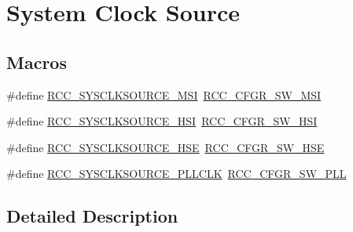 \hypertarget{group___r_c_c___system___clock___source}{\section{System Clock Source}
\label{group___r_c_c___system___clock___source}
}
\subsection*{Macros}
\begin{DoxyCompactItemize}
\item 
\#define \hyperlink{group___r_c_c___system___clock___source_ga1e02722521eb426d481d52ba9f79afef}{R\-C\-C\-\_\-\-S\-Y\-S\-C\-L\-K\-S\-O\-U\-R\-C\-E\-\_\-\-M\-S\-I}~\hyperlink{group___peripheral___registers___bits___definition_gaf76678c7a8f1366e115dbdd95e3568eb}{R\-C\-C\-\_\-\-C\-F\-G\-R\-\_\-\-S\-W\-\_\-\-M\-S\-I}
\item 
\#define \hyperlink{group___r_c_c___system___clock___source_gaaeeb699502e7d7a9f1b5d57fcf1f5095}{R\-C\-C\-\_\-\-S\-Y\-S\-C\-L\-K\-S\-O\-U\-R\-C\-E\-\_\-\-H\-S\-I}~\hyperlink{group___peripheral___registers___bits___definition_gacbac8bae4f0808b3c3a5185aa10081fb}{R\-C\-C\-\_\-\-C\-F\-G\-R\-\_\-\-S\-W\-\_\-\-H\-S\-I}
\item 
\#define \hyperlink{group___r_c_c___system___clock___source_ga9116d0627e1e7f33c48e1357b9a35a1c}{R\-C\-C\-\_\-\-S\-Y\-S\-C\-L\-K\-S\-O\-U\-R\-C\-E\-\_\-\-H\-S\-E}~\hyperlink{group___peripheral___registers___bits___definition_gafb563f217242d969f4355d0818fde705}{R\-C\-C\-\_\-\-C\-F\-G\-R\-\_\-\-S\-W\-\_\-\-H\-S\-E}
\item 
\#define \hyperlink{group___r_c_c___system___clock___source_ga5caf08ac71d7dd7e7b2e3e421606aca7}{R\-C\-C\-\_\-\-S\-Y\-S\-C\-L\-K\-S\-O\-U\-R\-C\-E\-\_\-\-P\-L\-L\-C\-L\-K}~\hyperlink{group___peripheral___registers___bits___definition_ga87389cacb2eaf53730da13a2a33cd487}{R\-C\-C\-\_\-\-C\-F\-G\-R\-\_\-\-S\-W\-\_\-\-P\-L\-L}
\end{DoxyCompactItemize}


\subsection{Detailed Description}


